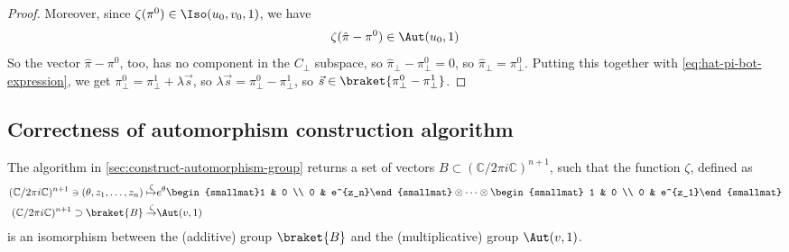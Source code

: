 \begin{proof}
	Moreover, since $\zeta(\pi^0)\in \Iso(u_0,v_0,1)$, we have
	\begin{align}
		\zeta(\hat\pi - \pi^0)\in\Aut(u_0,1)
	\end{align}
	So the vector $\hat\pi - \pi^0$, too, has no component in the $C_\bot$ subspace, so $\hat\pi_\bot-\pi_\bot^0=0$, so $\hat\pi_\bot=\pi_\bot^0$.
	Putting this together with \autoref{eq:hat-pi-bot-expression}, we get $\pi_\bot^0 = \pi_\bot^1 + \lambda\vec s$, so $\lambda\vec s=\pi_\bot^0-\pi_\bot^1$, so $\vec s\in \braket{\pi_\bot^0-\pi_\bot^1}$.
	
\end{proof}


\subsection{Correctness of automorphism construction algorithm}

\begin{theorem}
	The algorithm in \autoref{sec:construct-automorphism-group} returns a set of vectors $B\subset(\mathbb C/2\pi i\mathbb C)^{n+1}$, such that the function $\zeta$, defined as
	\begin{align}
		(\mathbb C/2\pi i\mathbb C)^{n+1}\ni (\theta,z_1,\ldots, z_n) \overset{\zeta}{\mapsto} &e^\theta\begin{smallmat}1 & 0 \\ 0 & e^{z_n}\end{smallmat}\otimes\cdots\otimes \begin{smallmat} 1 & 0 \\ 0 & e^{z_1}\end{smallmat} \\
		(\mathbb C/2\pi i\mathbb C)^{n+1}\supset \braket{B}\overset{\zeta}{\to}&\Aut(v,1)
	\end{align}
	is an isomorphism between the (additive) group $\braket{B}$ and the (multiplicative) group $\Aut(v,1)$.
\end{theorem}

